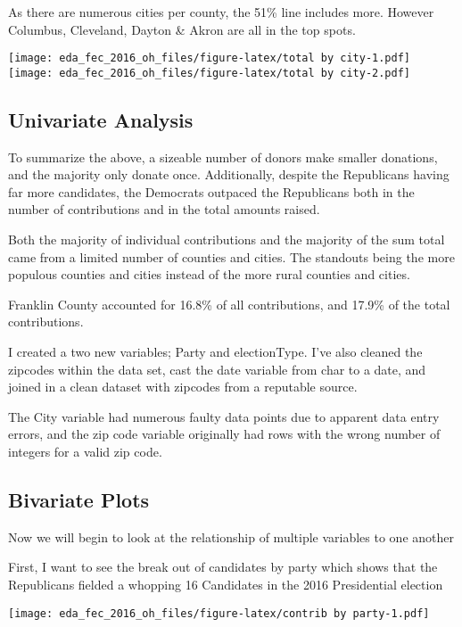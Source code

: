 \documentclass[]{article}
\begin{document}
As there are numerous cities per county, the 51\% line includes more.
However Columbus, Cleveland, Dayton \& Akron are all in the top spots.

\texttt{[image: eda\_fec\_2016\_oh\_files/figure-latex/total by city-1.pdf]}
\texttt{[image: eda\_fec\_2016\_oh\_files/figure-latex/total by city-2.pdf]}

\hypertarget{univariate-analysis}{%
\subsection{Univariate Analysis}\label{univariate-analysis}}

To summarize the above, a sizeable number of donors make smaller
donations, and the majority only donate once. Additionally, despite the
Republicans having far more candidates, the Democrats outpaced the
Republicans both in the number of contributions and in the total amounts
raised.

Both the majority of individual contributions and the majority of the
sum total came from a limited number of counties and cities. The
standouts being the more populous counties and cities instead of the
more rural counties and cities.

Franklin County accounted for 16.8\% of all contributions, and 17.9\% of
the total contributions.

I created a two new variables; Party and electionType. I've also cleaned
the zipcodes within the data set, cast the date variable from char to a
date, and joined in a clean dataset with zipcodes from a reputable
source.

The City variable had numerous faulty data points due to apparent data
entry errors, and the zip code variable originally had rows with the
wrong number of integers for a valid zip code.

\hypertarget{bivariate-plots}{%
\subsection{Bivariate Plots}\label{bivariate-plots}}

Now we will begin to look at the relationship of multiple variables to
one another

First, I want to see the break out of candidates by party which shows
that the Republicans fielded a whopping 16 Candidates in the 2016
Presidential election

\texttt{[image: eda\_fec\_2016\_oh\_files/figure-latex/contrib by party-1.pdf]}
\end{document}
